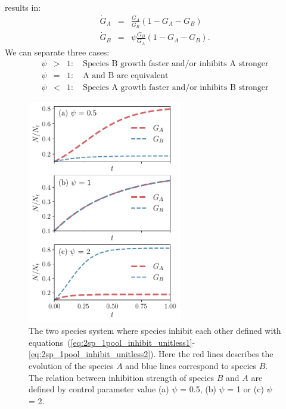 \documentclass[10pt,A4paper]{article}
\begin{document}
results in: 
\begin{eqnarray}
    \dot{G}_A &=&\frac{G_A}{G_B}\left(1 - G_A-G_B\right)
    \label{eq:2sp_1pool_inhibit_unitless1}\\
    \dot{G}_B &=&\psi\frac{G_B}{G_A}\left(1-G_A-G_B\right). 
    \label{eq:2sp_1pool_inhibit_unitless2}
\end{eqnarray}
We can separate three cases: 
\begin{eqnarray}
    \psi&>&1:\quad\text{Species B growth faster and/or inhibits A stronger}\\
    \psi&=&1:\quad\text{A and B are equivalent}\\
    \psi&<&1:\quad\text{Species A growth faster and/or inhibits B stronger}
\end{eqnarray}
%
\begin{figure}[H]
    \begin{center}
    \includegraphics[width=0.6\textwidth]{Figures/pool_model_1pool_inhib.pdf}
    \caption{
        The two species system where species inhibit each other defined with equations~(\ref{eq:2sp_1pool_inhibit_unitless1}-\ref{eq:2sp_1pool_inhibit_unitless2}).
        Here the red lines describes the evolution of the species $A$ and blue lines correspond to species $B$.
        The relation between inhibition strength of species $B$ and $A$ are defined by control parameter value (a) $\psi$ = 0.5, (b) $\psi$ = 1 or (c) $\psi$ = 2.
    }
    \label{fig:1pool_2sp_inhibit}
    \end{center}
\end{figure}
%
%
%
\end{document}
